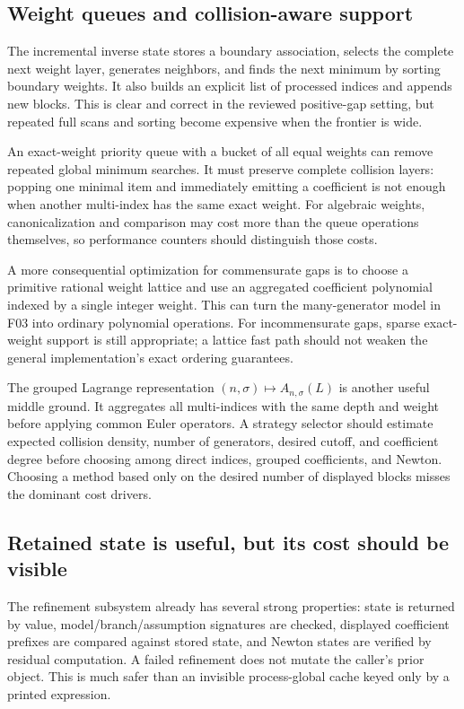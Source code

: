 \documentclass[11pt,a4paper]{article}
\theoremstyle{definition}
\begin{document}
\subsection{Weight queues and collision-aware support}

The incremental inverse state stores a boundary association, selects the complete next weight layer, generates neighbors, and finds the next minimum by sorting boundary weights. It also builds an explicit list of processed indices and appends new blocks. This is clear and correct in the reviewed positive-gap setting, but repeated full scans and sorting become expensive when the frontier is wide.\cite{incremental}

An exact-weight priority queue with a bucket of all equal weights can remove repeated global minimum searches. It must preserve complete collision layers: popping one minimal item and immediately emitting a coefficient is not enough when another multi-index has the same exact weight. For algebraic weights, canonicalization and comparison may cost more than the queue operations themselves, so performance counters should distinguish those costs.

A more consequential optimization for commensurate gaps is to choose a primitive rational weight lattice and use an aggregated coefficient polynomial indexed by a single integer weight. This can turn the many-generator model in F03 into ordinary polynomial operations. For incommensurate gaps, sparse exact-weight support is still appropriate; a lattice fast path should not weaken the general implementation's exact ordering guarantees.

The grouped Lagrange representation $(n,\sigma)\mapsto A_{n,\sigma}(L)$ is another useful middle ground. It aggregates all multi-indices with the same depth and weight before applying common Euler operators. A strategy selector should estimate expected collision density, number of generators, desired cutoff, and coefficient degree before choosing among direct indices, grouped coefficients, and Newton. Choosing a method based only on the desired number of displayed blocks misses the dominant cost drivers.

\subsection{Retained state is useful, but its cost should be visible}

The refinement subsystem already has several strong properties: state is returned by value, model/branch/assumption signatures are checked, displayed coefficient prefixes are compared against stored state, and Newton states are verified by residual computation. A failed refinement does not mutate the caller's prior object. This is much safer than an invisible process-global cache keyed only by a printed expression.\cite{refinement,incremental}
\end{document}
